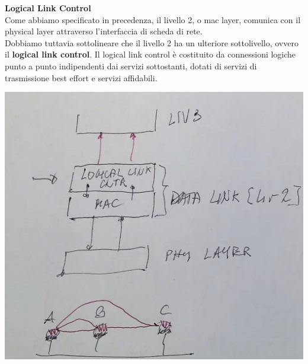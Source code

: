 \documentclass[11pt, oneside]{article}   	%
\begin{document}
\textbf{Logical Link Control}\\
Come abbiamo specificato in precedenza, il livello 2, o mac layer, comunica con il physical layer attraverso l'interfaccia di scheda di rete. \\Dobbiamo tuttavia sottolineare che il livello 2 ha un ulteriore sottolivello, ovvero il \textbf{logical link control}. 
Il logical link control è costituito da connessioni logiche punto a punto indipendenti dai servizi sottostanti, dotati di servizi di trasmissione best effort e servizi affidabili. 
\begin{center}
\includegraphics[scale=0.4]{llc}
\end{center}
\end{document}
